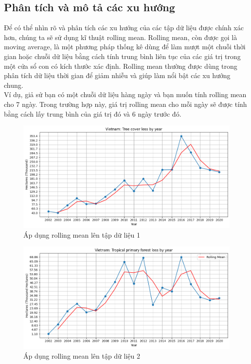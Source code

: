 \documentclass[a4paper,12pt]{report}
\begin{document}
\subsection{Phân tích và mô tả các xu hướng} %
\label{sub:phân_tích_và_mô_tả_các_xu_hướng}
\begin{flushleft}
	Để có thể nhìn rõ và phân tích các xu hướng của các tập dữ liệu được chính xác hơn, chúng ta sẽ sử dụng kĩ thuật rolling mean. Rolling mean, còn được gọi là moving average, là một phương pháp thống kê dùng để làm mượt một chuỗi thời gian hoặc chuỗi dữ liệu bằng cách tính trung bình liên tục của các giá trị trong một cửa sổ con có kích thước xác định. Rolling mean thường được dùng trong phân tích dữ liệu thời gian để giảm nhiễu và giúp làm nổi bật các xu hướng chung.
	\\[\baselineskip]

	Ví dụ, giả sử bạn có một chuỗi dữ liệu hàng ngày và bạn muốn tính rolling mean cho 7 ngày. Trong trường hợp này, giá trị rolling mean cho mỗi ngày sẽ được tính bằng cách lấy trung bình của giá trị đó và 6 ngày trước đó.
	\\[\baselineskip]

	\begin{figure}[H]
			\centering
			\includegraphics[width = \textwidth]{images/tree_cover_loss_by_year_rolling_mean.png}
			\caption{Áp dụng rolling mean lên tập dữ liệu 1}
	\end{figure}

	\begin{figure}[H]
			\centering
			\includegraphics[width = \textwidth]{images/tropical_primary_forest_loss_by_year_rolling_mean.png}
			\caption{Áp dụng rolling mean lên tập dữ liệu 2}
	\end{figure}


\end{flushleft}
\end{document}
